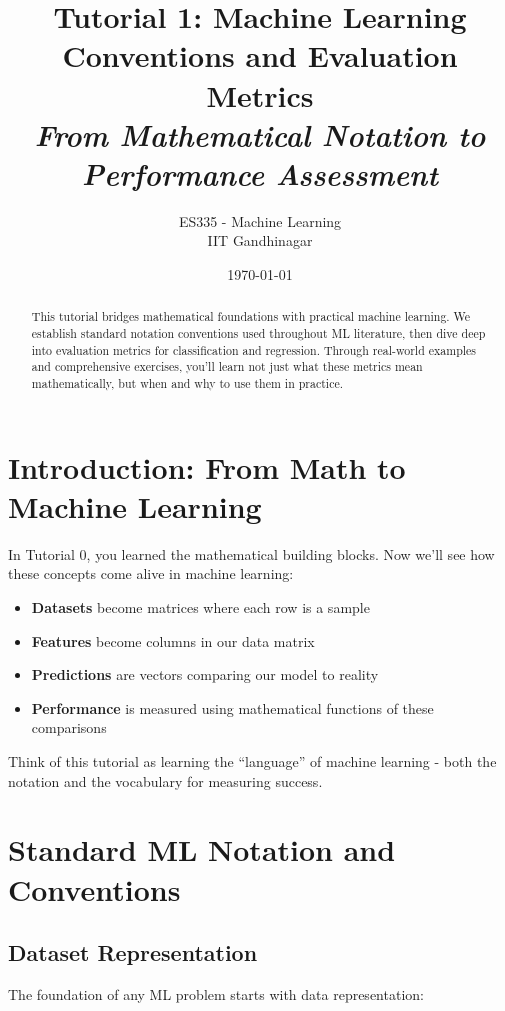 \documentclass{article}
\title{\textbf{Tutorial 1: Machine Learning Conventions and Evaluation Metrics} \\ \textit{From Mathematical Notation to Performance Assessment}}
\author{ES335 - Machine Learning \\ IIT Gandhinagar}
\date{\today}
\newcounter{example}
\newcounter{exercise}
\begin{document}
\maketitle

\begin{abstract}
This tutorial bridges mathematical foundations with practical machine learning. We establish standard notation conventions used throughout ML literature, then dive deep into evaluation metrics for classification and regression. Through real-world examples and comprehensive exercises, you'll learn not just what these metrics mean mathematically, but when and why to use them in practice.
\end{abstract}

\tableofcontents
\newpage

\section{Introduction: From Math to Machine Learning}

In Tutorial 0, you learned the mathematical building blocks. Now we'll see how these concepts come alive in machine learning:

\begin{itemize}
    \item \textbf{Datasets} become matrices where each row is a sample
    \item \textbf{Features} become columns in our data matrix  
    \item \textbf{Predictions} are vectors comparing our model to reality
    \item \textbf{Performance} is measured using mathematical functions of these comparisons
\end{itemize}

Think of this tutorial as learning the ``language'' of machine learning - both the notation and the vocabulary for measuring success.

\section{Standard ML Notation and Conventions}

\subsection{Dataset Representation}

The foundation of any ML problem starts with data representation:
\end{document}
